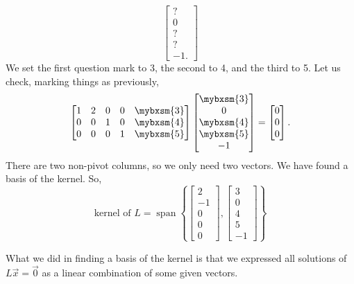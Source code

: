\begin{example}
\begin{equation*}
\begin{bmatrix}
? \\ 0 \\ ? \\ ? \\ -1 .
\end{bmatrix}
\end{equation*}
We set the first question mark to 3, the second to 4, and the
third to 5.  Let us check, marking things as previously,
\begin{equation*}
\begin{bmatrix}
1 & 2 & 0 & 0 & \mybxsm{3} \\
0 & 0 & 1 & 0 & \mybxsm{4} \\
0 & 0 & 0 & 1 & \mybxsm{5}
\end{bmatrix} 
\begin{bmatrix}
\mybxsm{3} \\ 0 \\ \mybxsm{4} \\ \mybxsm{5} \\ -1
\end{bmatrix}
=
\begin{bmatrix}
0 \\ 0 \\ 0
\end{bmatrix}
.
\end{equation*}
There are two non-pivot columns, so we only need two vectors.
We have found a basis of the kernel.  So,
\begin{equation*}
\text{kernel of $L$} =
\operatorname{span} \left\{
\begin{bmatrix}
2 \\ -1 \\ 0 \\ 0 \\ 0
\end{bmatrix}
,
\begin{bmatrix}
3 \\ 0 \\ 4 \\ 5 \\ -1
\end{bmatrix}
\right\}
\end{equation*}
\end{example}

What we did in finding a basis of the kernel is that we expressed all
solutions of
$L \vec{x} = \vec{0}$ as a linear combination of some given vectors.

